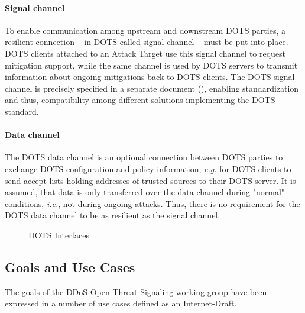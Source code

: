\paragraph{Signal channel} To enable communication among upstream and downstream DOTS parties, a resilient connection -- in DOTS called signal channel -- must be put into place. DOTS clients attached to an Attack Target use this signal channel to request mitigation support, while the same channel is used by DOTS servers to transmit information about ongoing mitigations back to DOTS clients. The DOTS signal channel is precisely specified in a separate document (\cite{dots-signal-channel}), enabling standardization and thus, compatibility among different solutions implementing the DOTS standard.
\paragraph{Data channel} The DOTS data channel is an optional connection between DOTS parties to exchange DOTS configuration and policy information, \emph{e.g.} for DOTS clients to send accept-lists holding addresses of trusted sources to their DOTS server. It is assumed, that data is only transferred over the data channel during "normal" conditions, \emph{i.e.}, not during ongoing attacks. Thus, there is no requirement for the DOTS data channel to be as resilient as the signal channel.

\begin{figure}[H]
\label{fig:DOTSarchitecture}
\centering
\caption{DOTS Interfaces \cite{dots-architecture}}
\end{figure}

\subsection{Goals and Use Cases}\label{goals}

The goals of the DDoS Open Threat Signaling working group have been expressed in a number of use cases defined as an Internet-Draft. 

